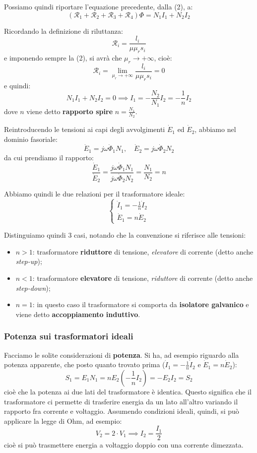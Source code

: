 \documentclass[a4paper,11pt]{article}
\begin{document}
Possiamo quindi riportare l'equazione precedente, dalla (2), a:
$$
(\mathcal{R}_1 + \mathcal{R}_2 + \mathcal{R}_3 + \mathcal{R}_4) \Phi = N_1 I_1 + N_2 I_2
$$

Ricordando la definizione di riluttanza:
$$
\mathcal{R}_i = \frac{l_i}{\mu \mu_r s_i}
$$
e imponendo sempre la (2), si avrà che $\mu_r \rightarrow +\infty$, cioè:
$$
\mathcal{R}_i = \lim_{\mu_r \rightarrow +\infty} \frac{l_i}{\mu \mu_r s_i} = 0
$$ 
e quindi:
$$
N_1 I_1 + N_2 I_2 = 0 \implies I_1 = -\frac{N_2}{N_1} I_2 = -\frac{1}{n} I_2
$$
dove $n$ viene detto \textbf{rapporto spire} $n = \frac{N_1}{N_2}$.

Reintroducendo le tensioni ai capi degli avvolgimenti $\dot{E}_1$ ed $\dot{E}_2$, abbiamo nel dominio fasoriale:
$$
\dot{E}_1 = j \omega \dot{\Phi}_1 N_1, \quad \dot{E}_2 = j \omega \dot{\Phi}_2 N_2
$$
da cui prendiamo il rapporto:
$$
\frac{\dot{E}_1}{\dot{E}_2} = \frac{j \omega \dot{\Phi}_1 N_1}{j \omega \dot{\Phi}_2 N_2} = \frac{N_1}{N_2} = n
$$

Abbiamo quindi le due relazioni per il trasformatore ideale:
\[
	\begin{cases}
		\dot{I}_1 = - \frac{1}{n} \dot{I}_2 \\ 
		\dot{E}_1 = n \dot{E}_2
	\end{cases}
\]

Distinguiamo quindi 3 casi, notando che la convenzione si riferisce alle tensioni:
\begin{itemize}
	\item $n > 1$: trasformatore \textbf{riduttore} di tensione, \textit{elevatore} di corrente (detto anche \textit{step-up});
	\item $n < 1$: trasformatore \textbf{elevatore} di tensione, \textit{riduttore} di corrente (detto anche \textit{step-down});
	\item $n = 1$: in questo caso il trasformatore si comporta da \textbf{isolatore galvanico} e viene detto \textbf{accoppiamento induttivo}.
\end{itemize}

\subsubsection{Potenza sui trasformatori ideali}

Facciamo le solite considerazioni di \textbf{potenza}.
Si ha, ad esempio riguardo alla potenza apparente, che posto quanto trovato prima ($\dot{I}_1 = -\frac{1}{n} \dot{I}_2$ e $\dot{E}_1 = n \dot{E}_2$):
$$
S_1 = E_1 N_1 = n E_2 \left( -\frac{1}{n} I_2 \right) = -E_2 I_2 = S_2
$$
cioè che la potenza ai due lati del trasformatore è identica.
Questo significa che il trasformatore ci permette di trasferire energia da un lato all'altro variando il rapporto fra corrente e voltaggio.
Assumendo condizioni ideali, quindi, si può applicare la legge di Ohm, ad esempio:
$$
V_2 = 2 \cdot V_1 \implies I_2 = \frac{I_1}{2}
$$
cioè si può trasmettere energia a voltaggio doppio con una corrente dimezzata.
\end{document}
